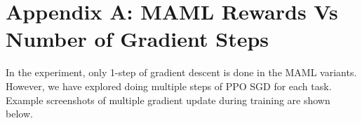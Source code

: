 \documentclass{article} %
\begin{document}






\section{Appendix A: MAML Rewards Vs Number of Gradient Steps} 

In the experiment, only 1-step of gradient descent is done in the MAML variants. However, we have explored doing multiple steps of PPO SGD for each task. Example screenshots of multiple gradient update during training are shown below.
\end{document}
